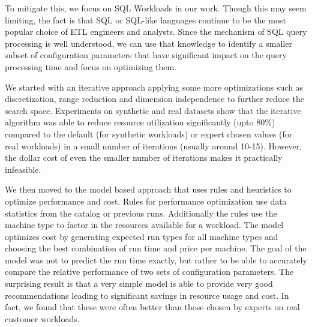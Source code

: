 To mitigate this, we focus on SQL Workloads in our work. Though this may seem limiting, the fact is that SQL or SQL-like languages continue to be the most popular choice of ETL engineers and analysts. Since the mechanism of SQL query processing is well understood, we can use that knowledge to identify a smaller subset of configuration parameters that have significant impact on the query processing time and focus on optimizing them. 

We started with an iterative approach applying some more optimizations such as discretization, range reduction and dimension independence to further reduce the search space. Experiments on synthetic and real datasets show that the iterative algorithm was able to reduce resource utilization significantly (upto 80\%) compared to the default (for synthetic workloads) or expert chosen values (for real workloads) in a small number of iterations (usually around 10-15). However, the dollar cost of even the smaller number of iterations makes it practically infeasible.

We then moved to the model based approach that uses rules and heuristics to optimize performance and cost. Rules for performance optimization use data statistics from the catalog or previous runs. Additionally the rules use the machine type to factor in the resources available for a workload. The model optimizes cost by generating expected run types for all machine types and choosing the best combination of run time and price per machine. The goal of the model was not to predict the run time exactly, but rather to be able to accurately compare the relative performance of two sets of configuration parameters. The surprising result is that a very simple model is able to provide very good recommendations leading to significant savings in resource usage and cost. In fact, we found that these were often better than those chosen by experts on real customer workloads.


